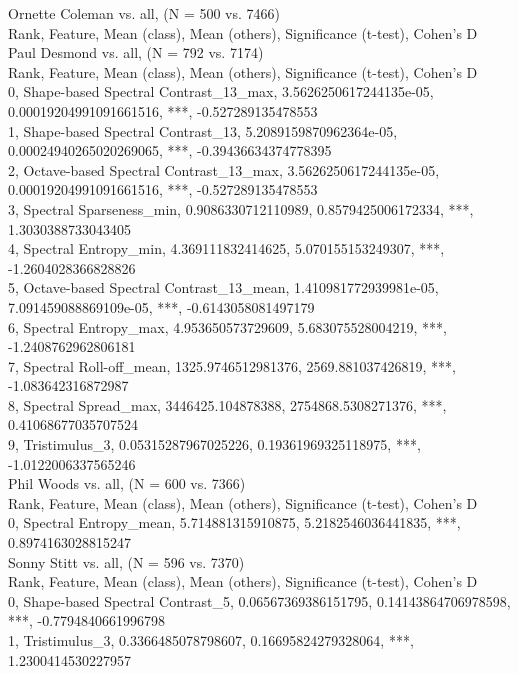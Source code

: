 Ornette Coleman vs. all, (N = 500 vs. 7466)\\
Rank, Feature, Mean (class), Mean (others), Significance (t-test), Cohen's D\\
Paul Desmond vs. all, (N = 792 vs. 7174)\\
Rank, Feature, Mean (class), Mean (others), Significance (t-test), Cohen's D\\
0, Shape-based Spectral Contrast_13_max, 3.5626250617244135e-05, 0.00019204991091661516, ***, -0.527289135478553\\
1, Shape-based Spectral Contrast_13, 5.2089159870962364e-05, 0.00024940265020269065, ***, -0.39436634374778395\\
2, Octave-based Spectral Contrast_13_max, 3.5626250617244135e-05, 0.00019204991091661516, ***, -0.527289135478553\\
3, Spectral Sparseness_min, 0.9086330712110989, 0.8579425006172334, ***, 1.3030388733043405\\
4, Spectral Entropy_min, 4.369111832414625, 5.070155153249307, ***, -1.2604028366828826\\
5, Octave-based Spectral Contrast_13_mean, 1.410981772939981e-05, 7.091459088869109e-05, ***, -0.6143058081497179\\
6, Spectral Entropy_max, 4.953650573729609, 5.683075528004219, ***, -1.2408762962806181\\
7, Spectral Roll-off_mean, 1325.9746512981376, 2569.881037426819, ***, -1.083642316872987\\
8, Spectral Spread_max, 3446425.104878388, 2754868.5308271376, ***, 0.41068677035707524\\
9, Tristimulus_3, 0.05315287967025226, 0.19361969325118975, ***, -1.0122006337565246\\
Phil Woods vs. all, (N = 600 vs. 7366)\\
Rank, Feature, Mean (class), Mean (others), Significance (t-test), Cohen's D\\
0, Spectral Entropy_mean, 5.714881315910875, 5.2182546036441835, ***, 0.8974163028815247\\
Sonny Stitt vs. all, (N = 596 vs. 7370)\\
Rank, Feature, Mean (class), Mean (others), Significance (t-test), Cohen's D\\
0, Shape-based Spectral Contrast_5, 0.06567369386151795, 0.14143864706978598, ***, -0.7794840661996798\\
1, Tristimulus_3, 0.3366485078798607, 0.16695824279328064, ***, 1.2300414530227957\\
